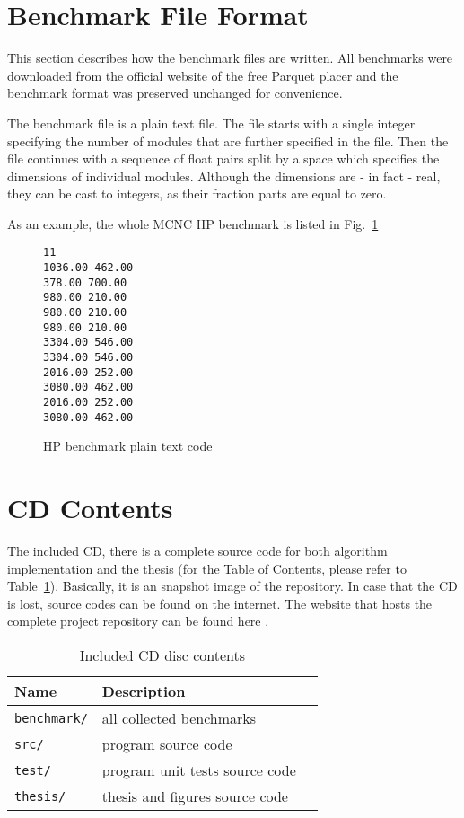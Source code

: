 \section{Benchmark File Format}

This section describes how the benchmark files are written. All benchmarks were downloaded from the official website of the free Parquet placer \cite{bench} and the benchmark format was preserved unchanged for convenience.

The benchmark file is a plain text file. The file starts with a single integer specifying the number of modules that are further specified in the file. Then the file continues with a sequence of float pairs split by a space which specifies the dimensions of individual modules. Although the dimensions are - in fact - real, they can be cast to integers, as their fraction parts are equal to zero.

As an example, the whole MCNC HP benchmark is listed in Fig.~\ref{fig:hpcode}

\begin{figure}
\begin{minipage}{\textwidth}
\begin{verbatim}
11 
1036.00 462.00 
378.00 700.00 
980.00 210.00 
980.00 210.00 
980.00 210.00 
3304.00 546.00 
3304.00 546.00 
2016.00 252.00 
3080.00 462.00 
2016.00 252.00 
3080.00 462.00 
\end{verbatim}
\end{minipage}
\caption{HP benchmark plain text code}
\label{fig:hpcode}
\end{figure}

\section{CD Contents}

The included CD, there is a complete source code for both algorithm implementation and the thesis (for the Table of Contents, please refer to Table~\ref{tab:cd}). Basically, it is an snapshot image of the repository. In case that the CD is lost, source codes can be found on the internet. The website that hosts the complete project repository can be found here \cite{repository}.

\begin{table}
\begin{center}
\begin{tabular}{|l|l|l|}
\hline
Name & Description \\
\hline
\hline
{\tt benchmark/} & all collected benchmarks \\
\hline
{\tt src/} & program source code \\
\hline
{\tt test/} & program unit tests source code \\
\hline
{\tt thesis/} & thesis and figures source code \\
\hline
\end{tabular}
\end{center}
\caption{Included CD disc contents}
\label{tab:cd}
\end{table}
